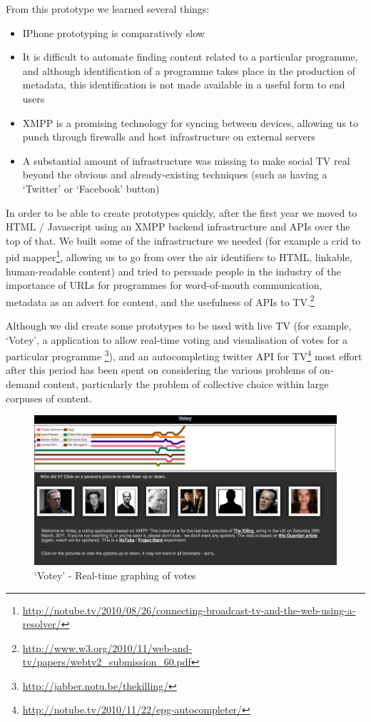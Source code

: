 \documentclass{notube}
\begin{document}
From this prototype we learned several things:

\begin{itemize}
\item{IPhone prototyping is comparatively slow}
\item{It is difficult to automate finding content related to a particular programme, and although identification of a programme takes place in the production of metadata, this identification is not made available in a useful form to end users}
\item{XMPP is a promising technology for syncing between devices, allowing us to punch through firewalls and host infrastructure on external servers}
\item{A substantial amount of infrastructure was missing to make social TV real beyond the obvious and already-existing techniques (such as having a `Twitter' or `Facebook' button)}
\end{itemize}

In order to be able to create prototypes quickly, after the first year we moved to HTML / Javascript using an XMPP backend infrastructure and APIs over the top of that. We built some of the infrastructure we needed (for example a crid to pid mapper\footnote{\url{http://notube.tv/2010/08/26/connecting-broadcast-tv-and-the-web-using-a-resolver/}}, allowing us to go from over the air identifiers to HTML, linkable, human-readable content) and tried to persuade people in the industry of the importance of URLs for programmes for word-of-mouth communication, metadata as an advert for content, and the usefulness of APIs to TV.\footnote{\url{http://www.w3.org/2010/11/web-and-tv/papers/webtv2_submission_60.pdf}}

Although we did create some prototypes to be used with live TV (for example, `Votey', a application to allow real-time voting and visualisation of votes for a particular programme \footnote{\url{http://jabber.notu.be/thekilling/}}), and an autocompleting twitter API for TV\footnote{\url{http://notube.tv/2010/11/22/epg-autocompleter/}} most effort after this period has been spent on considering the various problems of on-demand content, particularly the problem of collective choice within large corpuses of content.

\begin{figure}[htbp]
\begin{center}
\includegraphics[width=6in]{images/votey.png}
\caption{`Votey' - Real-time graphing of votes} \label{fig:votey}
\end{center}
\end{figure} 
\end{document}
